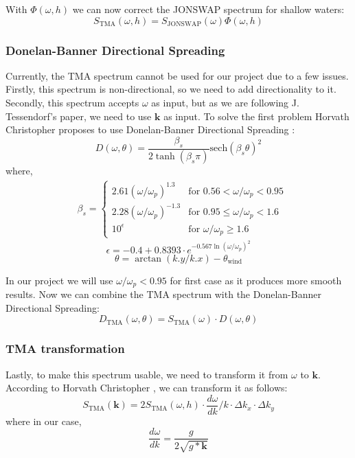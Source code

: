 With $\Phi(\omega, h)$ we can now correct the JONSWAP spectrum for shallow waters:
\begin{equation}
    S_{\text{TMA}}(\omega, h) = S_{\text{JONSWAP}}(\omega) \Phi(\omega, h)
    \label{eq:tma_spectrum}
\end{equation}

\subsubsection{Donelan-Banner Directional Spreading}
Currently, the TMA spectrum cannot be used for our project due to a few issues. Firstly, this spectrum is non-directional, so we need to add directionality to it. Secondly, this spectrum accepts $\omega$ as input, but as we are following J. Tessendorf's \cite{tessendorf2001} paper, we need to use $\mathbf{k}$ as input.
To solve the first problem Horvath Christopher \cite{horvath2015} proposes to use Donelan-Banner Directional Spreading \cite{young1999}:
\begin{equation}
    D(\omega, \theta) = \frac{\beta_s}{2 \tanh(\beta_s\pi)}\text{sech}(\beta_s\theta)^{2}
\end{equation}
where,
$$
\begin{aligned}
    &\beta_s =
    \begin{cases} 
    2.61(\omega/\omega_p)^{1.3} & \text{for } 0.56 < \omega/\omega_p < 0.95 \\
    2.28(\omega/\omega_p)^{-1.3} & \text{for } 0.95 \leq \omega/\omega_p < 1.6 \\
    10^{\epsilon} & \text{for } \omega/\omega_p \geq 1.6
    \end{cases}
\end{aligned}
$$
$$
\epsilon = -0.4 + 0.8393 \cdot e^{-0.567\ln(\omega/\omega_p)^{2}}
$$
$$
\theta = \arctan(k.y / k.x) - \theta_{\text{wind}}
$$

In our project we will use $\omega/\omega_p < 0.95$ for first case as it produces more smooth results.
Now we can combine the TMA spectrum with the Donelan-Banner Directional Spreading:
\begin{equation}
    D_{\text{TMA}}(\omega, \theta) = S_{\text{TMA}}(\omega) \cdot D(\omega, \theta)
\end{equation}

\subsubsection{TMA transformation}
Lastly, to make this spectrum usable, we need to transform it from $\omega$ to $\mathbf{k}$. According to Horvath Christopher \cite{horvath2015}, we can transform it as follows:
\begin{equation}
    S_{\text{TMA}}(\mathbf{k}) = 2S_{\text{TMA}}(\omega, h) \cdot \frac{d\omega}{dk} / k \cdot \Delta k_x \cdot \Delta k_y
    \label{eq:tma_spectrum_k}
\end{equation}
where in our case,
$$
\frac{d\omega}{dk} = \frac{g}{2\sqrt{g*\mathbf{k}}}
$$

